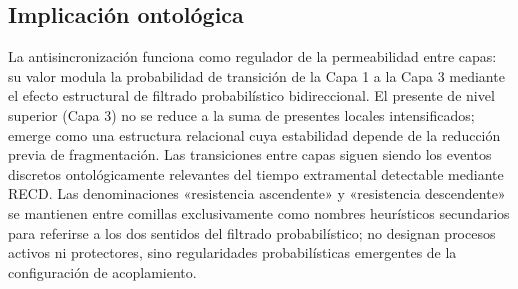 \subsection{Implicación ontológica}

La antisincronización funciona como regulador de la permeabilidad entre capas: su valor modula la probabilidad de transición de la Capa 1 a la Capa 3 mediante el efecto estructural de filtrado probabilístico bidireccional. El presente de nivel superior (Capa 3) no se reduce a la suma de presentes locales intensificados; emerge como una estructura relacional cuya estabilidad depende de la reducción previa de fragmentación. Las transiciones entre capas siguen siendo los eventos discretos ontológicamente relevantes del tiempo extramental detectable mediante RECD. Las denominaciones «resistencia ascendente» y «resistencia descendente» se mantienen entre comillas exclusivamente como nombres heurísticos secundarios para referirse a los dos sentidos del filtrado probabilístico; no designan procesos activos ni protectores, sino regularidades probabilísticas emergentes de la configuración de acoplamiento.